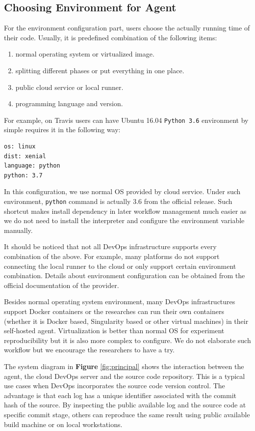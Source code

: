 \documentclass{IEEEcsmag}
\begin{document}
\subsection{Choosing Environment for Agent}
For the environment configuration part, users choose the actually running time of their code. Usually, it is predefined combination of the following items:
\begin{enumerate}
\item normal operating system or virtualized image.
\item splitting different phases or put everything in one place.
\item public cloud service or local runner.
\item programming language and version.
\end{enumerate}

For example, on Travis users can have Ubuntu 16.04 \texttt{Python 3.6} environment by simple requires it in the following way:
\begin{lstlisting}[caption={environment configuration}]
os: linux
dist: xenial
language: python
python: 3.7
\end{lstlisting}

In this configuration, we use normal OS provided by cloud service. Under such environment, \texttt{python} command is actually 3.6 from the official release.
Such shortcut makes install dependency in later workflow management much easier as we do not need to install the interpreter and configure the environment variable manually.

It should be noticed that not all DevOps infrastructure supports every combination of the above. For example, many platforms do not support connecting the local runner to the cloud or only support certain environment combination. Details about environment configuration can be obtained from the official documentation of the provider.

Besides normal operating system environment, many DevOps infrastructures support Docker containers or the researches can run their own containers (whether it is Docker based, Singularity based or other virtual machines) in their self-hosted agent. Virtualization is better than normal OS for experiment reproducibility but it is also more complex to configure. We do not elaborate such workflow but we encourage the researchers to have a try.

The system diagram in \textbf{Figure} \ref{fig:principal} shows the interaction between the agent, the cloud DevOps server and the source code repository. 
This is a typical use cases when DevOps incorporates the source code version control. The advantage is that each log has a unique identifier associated with the commit hash of the source. By inspecting the public available log and the source code at specific commit stage, others can reproduce the same result using public available build machine or on local workstations.
\end{document}

